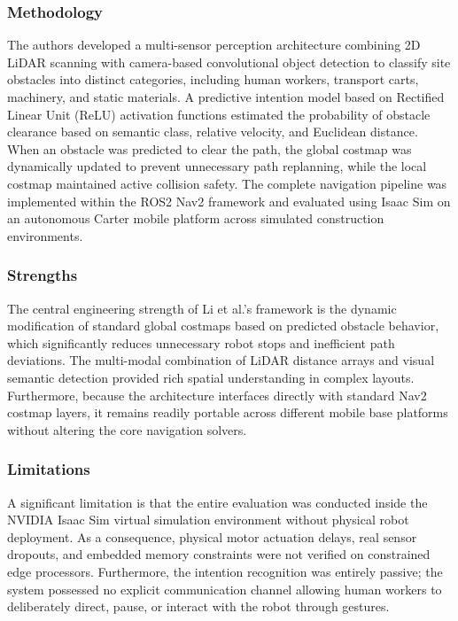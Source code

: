 \subsubsection{Methodology}
The authors developed a multi-sensor perception architecture combining 2D LiDAR scanning with camera-based convolutional object detection to classify site obstacles into distinct categories, including human workers, transport carts, machinery, and static materials. A predictive intention model based on Rectified Linear Unit (ReLU) activation functions estimated the probability of obstacle clearance based on semantic class, relative velocity, and Euclidean distance. When an obstacle was predicted to clear the path, the global costmap was dynamically updated to prevent unnecessary path replanning, while the local costmap maintained active collision safety. The complete navigation pipeline was implemented within the ROS2 Nav2 framework and evaluated using Isaac Sim on an autonomous Carter mobile platform across simulated construction environments.

\subsubsection{Strengths}
The central engineering strength of Li et al.'s framework is the dynamic modification of standard global costmaps based on predicted obstacle behavior, which significantly reduces unnecessary robot stops and inefficient path deviations. The multi-modal combination of LiDAR distance arrays and visual semantic detection provided rich spatial understanding in complex layouts. Furthermore, because the architecture interfaces directly with standard Nav2 costmap layers, it remains readily portable across different mobile base platforms without altering the core navigation solvers.

\subsubsection{Limitations}
A significant limitation is that the entire evaluation was conducted inside the NVIDIA Isaac Sim virtual simulation environment without physical robot deployment. As a consequence, physical motor actuation delays, real sensor dropouts, and embedded memory constraints were not verified on constrained edge processors. Furthermore, the intention recognition was entirely passive; the system possessed no explicit communication channel allowing human workers to deliberately direct, pause, or interact with the robot through gestures.

